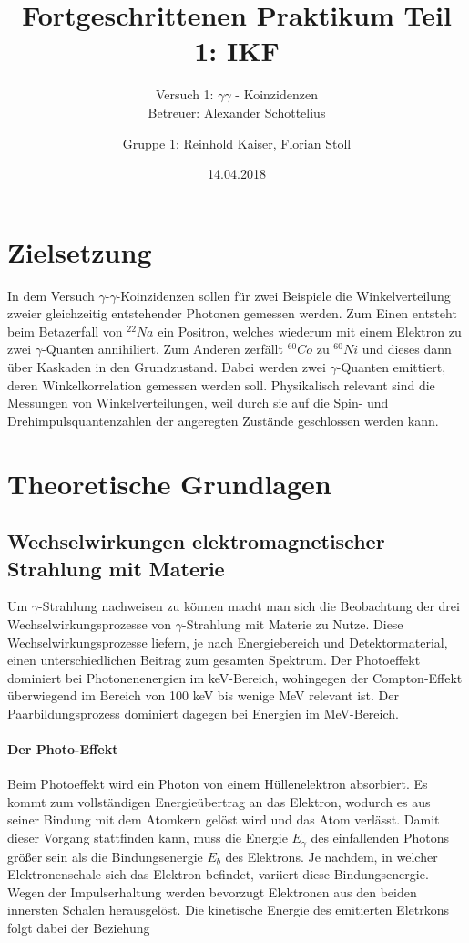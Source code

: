 \documentclass[11pt]{scrartcl}
\title{Fortgeschrittenen Praktikum Teil 1: IKF}
\subtitle{Versuch 1: $\gamma \gamma$ - Koinzidenzen \\ Betreuer: Alexander Schottelius}
\author{Gruppe 1: Reinhold Kaiser, Florian Stoll}
\date{14.04.2018}
\begin{document}
\maketitle
\newpage
\tableofcontents
\newpage

\section{Zielsetzung}
In dem Versuch $\gamma$-$\gamma$-Koinzidenzen sollen für zwei Beispiele die Winkelverteilung zweier gleichzeitig entstehender Photonen
gemessen werden. Zum Einen entsteht beim Betazerfall von $^{22}Na$ ein Positron, welches wiederum mit
einem Elektron zu zwei $\gamma$-Quanten annihiliert. Zum Anderen zerfällt $^{60}Co$ zu $^{60}Ni$
und dieses dann über Kaskaden in den Grundzustand. Dabei werden zwei $\gamma$-Quanten emittiert,
deren Winkelkorrelation gemessen werden soll. Physikalisch relevant sind die Messungen von 
Winkelverteilungen, weil durch sie auf die Spin- und Drehimpulsquantenzahlen der angeregten Zustände 
geschlossen werden kann.


\section{Theoretische Grundlagen}

\subsection{Wechselwirkungen elektromagnetischer Strahlung mit Materie}

Um $\gamma$-Strahlung nachweisen zu können macht man sich die Beobachtung der drei Wechselwirkungsprozesse von $\gamma$-Strahlung mit Materie zu Nutze. Diese Wechselwirkungsprozesse liefern, je nach Energiebereich und Detektormaterial, einen unterschiedlichen Beitrag zum gesamten Spektrum. Der Photoeffekt dominiert bei Photonenenergien im keV-Bereich, wohingegen der Compton-Effekt überwiegend im Bereich von 100 keV bis wenige MeV relevant ist. Der Paarbildungsprozess dominiert dagegen bei Energien im MeV-Bereich.

\paragraph{Der Photo-Effekt}

Beim Photoeffekt wird ein Photon von einem Hüllenelektron absorbiert. Es kommt zum vollständigen Energieübertrag an das Elektron, wodurch es aus seiner Bindung mit dem Atomkern gelöst wird und das Atom verlässt. Damit dieser Vorgang stattfinden kann, muss die Energie $E_\gamma$ des einfallenden Photons größer sein als die Bindungsenergie $E_b$ des Elektrons. Je nachdem, in welcher Elektronenschale sich das Elektron befindet, variiert diese Bindungsenergie. Wegen der Impulserhaltung werden bevorzugt Elektronen aus den beiden innersten Schalen herausgelöst. Die kinetische Energie des emitierten Eletrkons folgt dabei der Beziehung
\end{document}

